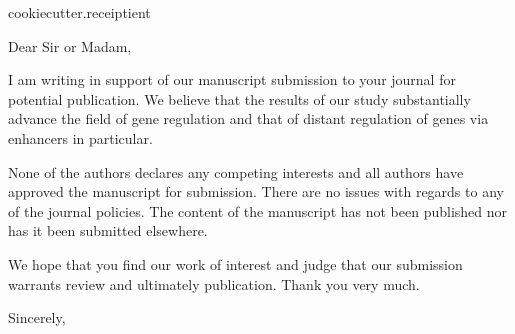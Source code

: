 \documentclass[a4paper]{scrlttr2}
\begin{document}
\begin{letter}{
  {{cookiecutter.receiptient}}
}

\opening{Dear Sir or Madam,}

\thispagestyle{firststyle}

I am writing in support of our manuscript submission to your journal
for potential publication. We believe that the results of our study
substantially advance the field of gene regulation and that of distant
regulation of genes via enhancers in particular. 

None of the authors declares any competing interests and all authors have
approved the manuscript for submission. 
There are no issues with regards to any of the journal policies.
The content of the manuscript has not been published nor has it been submitted elsewhere.

We hope that you find our work of interest and judge that our submission
warrants review and ultimately publication. 
Thank you very much.


\bigskip
\bigskip
\closing{Sincerely,}

\end{letter}

\end{document}
